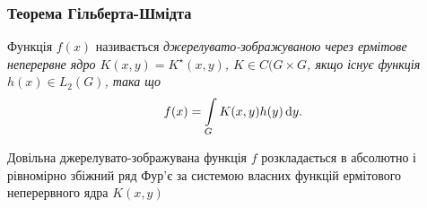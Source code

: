 \subsubsection{Теорема Гільберта-Шмідта}

\begin{definition}
	Функція $f(x)$ називається \it{джерелувато-зображуваною} через ермітове неперервне ядро $K(x, y) = K^\star (x, y)$, $K \in C(G \times G$, якщо існує функція $h(x) \in L_2(G)$, така що 
	\begin{equation}
		f(x) = \displaystyle\int\limits_G K(x, y) h(y) \mathop{}\!\mathrm{d} y.
	\end{equation}
\end{definition}

\begin{theorem}
	Довільна джерелувато-зображувана функція $f$ розкладається в абсолютно і рівномірно збіжний ряд Фур'є за системою власних функцій ермітового неперервного ядра $K(x, y)$
\end{theorem}

